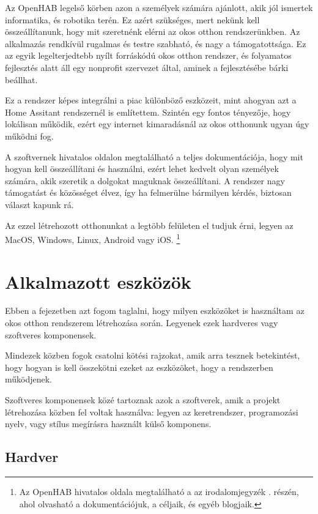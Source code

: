 \documentclass[
]{thesis-ekf}
\theoremstyle{definition}
\theoremstyle{remark}
\begin{document}
	Az OpenHAB legelső körben azon a személyek számára ajánlott, akik jól ismertek informatika, és robotika terén. Ez azért szükséges, mert nekünk kell összeállítanunk, hogy mit szeretnénk elérni az okos otthon rendszerünkben. Az alkalmazás rendkívül rugalmas és testre szabható, és nagy a támogatottsága. Ez az egyik legelterjedtebb nyílt forráskódú okos otthon rendszer, és folyamatos fejlesztés alatt áll egy nonprofit szervezet által, aminek a fejlesztésébe bárki beállhat.
	
	Ez a rendszer képes integrálni a piac különböző eszközeit, mint ahogyan azt a Home Assitant rendszernél is említettem. Szintén egy fontos tényezője, hogy lokálisan működik, ezért egy internet kimaradásnál az okos otthonunk ugyan úgy működni fog. 
	
	A szoftvernek hivatalos oldalon megtalálható a teljes dokumentációja, hogy mit hogyan kell összeállítani és használni, ezért lehet kedvelt olyan személyek számára, akik szeretik a dolgokat maguknak összeállítani. A rendszer nagy támogatást és közösséget élvez, így ha felmerülne bármilyen kérdés, biztosan választ kapunk rá.
	
	Az ezzel létrehozott otthonunkat a legtöbb felületen el tudjuk érni, legyen az MacOS, Windows, Linux, Android vagy iOS.
	\footnote{Az OpenHAB hivatalos oldala megtalálható a az irodalomjegyzék \cite{openhab}. részén, ahol olvasható a dokumentációjuk, a céljaik, és egyéb blogjaik.}
	
	\chapter{Alkalmazott eszközök}
	
	Ebben a fejezetben azt fogom taglalni, hogy milyen eszközöket is használtam az okos otthon rendszerem létrehozása során. Legyenek ezek hardveres vagy szoftveres komponensek. 
	
	Mindezek közben fogok csatolni kötési rajzokat, amik arra tesznek betekintést, hogy hogyan is kell összekötni ezeket az eszközöket, hogy a rendszerben működjenek.
	
	Szoftveres komponensek közé tartoznak azok a szoftverek, amik a projekt létrehozása közben fel voltak használva: legyen az keretrendszer, programozási nyelv, vagy stílus megírásra használt külső komponens.
	
	\section{Hardver}\label{hardware-sec}
\end{document}
